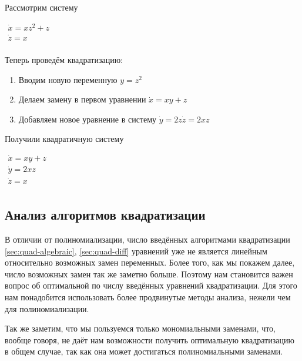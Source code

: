 \begin{example}
    Рассмотрим систему

    $\begin{array}{lcl}
        \dot x = xz^2 + z \\
        \dot z = x \\
    \end{array}$
    \newline
    
    Теперь проведём квадратизацию:
    \begin{enumerate}
        \item Вводим новую переменную $y = z^2$
        \item Делаем замену в первом уравнении $\dot x = xy + z$
        \item Добавляем новое уравнение в систему $\dot y = 2z \dot z = 2xz$
    \end{enumerate}
    
     Получили квадратичную систему
    
    $\begin{array}{lcl}
        \dot x = xy + z \\
        \dot y = 2xz \\
        \dot z = x \\
    \end{array}$
\end{example}

\subsection{Анализ алгоритмов квадратизации} \label{sec:quad-analysis}

В отличии от полиномиализации, число введённых алгоритмами квадратизации \ref{sec:quad-algebraic}, \ref{sec:quad-diff} уравнений уже не является линейным относительно возможных замен переменных. Более того, как мы покажем далее, число возможных замен так же заметно больше. Поэтому нам становится важен вопрос об оптимальной по числу введённых уравнений квадратизации. Для этого нам понадобится использовать более продвинутые методы анализа, нежели чем для полиномиализации.

Так же заметим, что мы пользуемся только мономиальными заменами, что, вообще говоря, не даёт нам возможности получить оптимальную квадратизацию в общем случае, так как она может достигаться полиномиальными заменами.



\pagebreak

